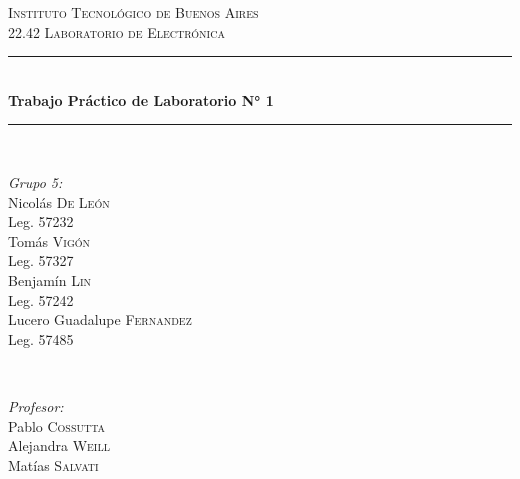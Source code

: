 \begin{titlepage}
    
\newcommand{\HRule}{\rule{\linewidth}{0.5mm}} %
    
\center %
     
    
\textsc{\LARGE Instituto Tecnológico de Buenos Aires}\\[2cm] %
\textsc{\Large 22.42 Laboratorio de Electrónica}\\[1.5cm] %
    
    
\HRule \\[0.5cm]
{ \huge \bfseries Trabajo Práctico de Laboratorio N° 1}\\[0.4cm] %
\HRule \\[2cm]
     
    
\begin{minipage}{0.4\textwidth}
\begin{flushleft} \large
\emph{Grupo 5:}\\		%
[.3cm]
Nicolás \textsc{De León}\\
Leg. 57232\\ 
[.3cm]
Tomás \textsc{Vigón}\\
Leg. 57327\\ 
[.3cm]
Benjamín \textsc{Lin}\\
Leg. 57242 \\ 
[.3cm]
Lucero Guadalupe \textsc{Fernandez}\\
Leg. 57485\\ 
[.3cm]
\end{flushleft}
\end{minipage}
~
\begin{minipage}{0.4\textwidth}
\begin{flushright} \large
\emph{Profesor:} \\
[.3cm]
Pablo  \textsc{Cossutta}\\ %
Alejandra \textsc{Weill} \\%
Matías  \textsc{Salvati} %
\end{flushright}
\end{minipage}\\[2cm]
    

\end{titlepage}

